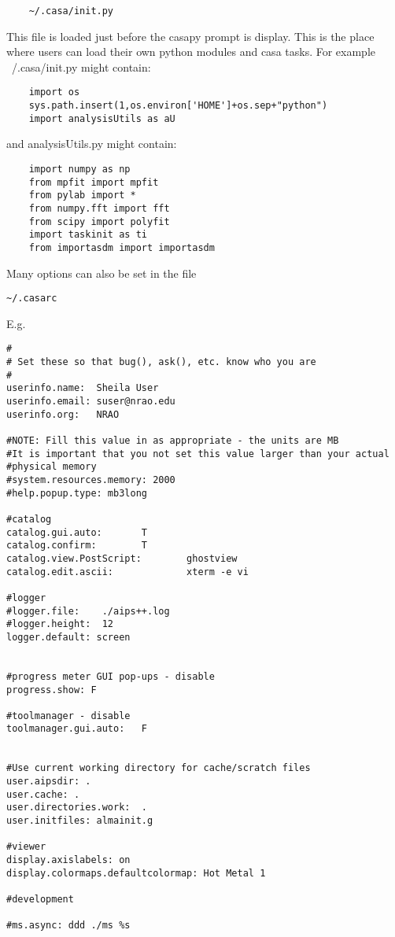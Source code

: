 \small
\begin{verbatim}
	~/.casa/init.py
\end{verbatim}
\normalsize

This file is loaded just before the casapy prompt is display. This is
the place where users can load their own python modules and casa
tasks. For example ~/.casa/init.py might contain:

\small
\begin{verbatim}
	import os
	sys.path.insert(1,os.environ['HOME']+os.sep+"python")
	import analysisUtils as aU
\end{verbatim}
\normalsize

and analysisUtils.py might contain:

\small
\begin{verbatim}
	import numpy as np
	from mpfit import mpfit
	from pylab import *
	from numpy.fft import fft
	from scipy import polyfit
	import taskinit as ti
	from importasdm import importasdm
 \end{verbatim}
\normalsize


Many options can also be set in the file 


\small
\begin{verbatim}
~/.casarc
\end{verbatim}
\normalsize

E.g. 

\small
\begin{verbatim}
#
# Set these so that bug(), ask(), etc. know who you are
#
userinfo.name:  Sheila User
userinfo.email: suser@nrao.edu
userinfo.org:   NRAO

#NOTE: Fill this value in as appropriate - the units are MB
#It is important that you not set this value larger than your actual
#physical memory
#system.resources.memory: 2000
#help.popup.type: mb3long

#catalog
catalog.gui.auto:       T
catalog.confirm:        T
catalog.view.PostScript:        ghostview
catalog.edit.ascii:             xterm -e vi

#logger
#logger.file:    ./aips++.log
#logger.height:  12
logger.default: screen


#progress meter GUI pop-ups - disable
progress.show: F

#toolmanager - disable
toolmanager.gui.auto:   F


#Use current working directory for cache/scratch files
user.aipsdir: .
user.cache: .
user.directories.work:  .
user.initfiles: almainit.g

#viewer
display.axislabels: on
display.colormaps.defaultcolormap: Hot Metal 1

#development

#ms.async: ddd ./ms %s
\end{verbatim}
\normalsize

